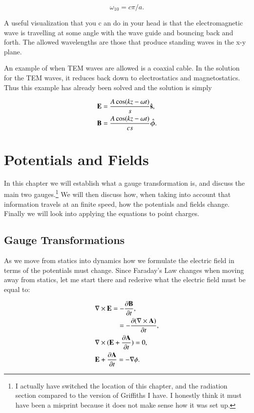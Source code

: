 \documentclass[preprint, review,12pt]{elsarticle}
\def\x{\times}
\def\b{\textbf}
\def\curl{\nabla \x}
\newcommand{\pd}[2]{\frac{\partial #1 }{\partial #2}}
\newcommand{\hb}[1]{\hat{\b #1}}
\newcommand{\hbm}[1]{\hat{\bm #1}}
\begin{document}
\begin{equation}
    \omega_{10} = c \pi /a.
\end{equation}

A useful visualization that you c an do in your head is that the electromagnetic wave is travelling at some angle with the wave guide and bouncing back and forth. The allowed wavelengths are those that produce standing waves in the x-y plane. 

An example of when TEM waves are allowed is a coaxial cable. In the solution for the TEM waves, it reduces back down to electrostatics and magnetostatics. Thus this example has already been solved and the solution is simply

\begin{equation}
\begin{split}
    & \b E = \frac{A\cos(kz-\omega t)}{s}\hb{s}, \\
    & \b B = \frac{A\cos(kz-\omega t)}{cs}\hbm{\phi}.
\end{split}
\end{equation}

\section{Potentials and Fields}

In this chapter we will establish what a gauge transformation is, and discuss the main two gauges.\footnote{I actually have switched the location of this chapter, and the radiation section compared to the version of Griffiths I have. I honestly think it must have been a misprint because it does not make sense how it was set up.} We will then discuss how, when taking into account that information travels at an finite speed, how the potentials and fields change. Finally we will look into applying the equations to point charges.

\subsection{Gauge Transformations}

As we move from statics into dynamics how we formulate the electric field in terms of the potentials must change. Since Faraday's Law changes when moving away from statics, let me start there and rederive what the electric field must be equal to:

\begin{equation*}
\begin{split}
    & \curl \b E = -\pd{\b B}{t}, \\
    & \quad \hspace{23pt} = -\pd{(\curl \b A)}{t}, \\
    & \curl (\b E + \pd{\b A}{t} ) = 0, \\
    & \b E + \pd{\b A}{t} = -\nabla \phi.
\end{split}
\end{equation*}
\end{document}
